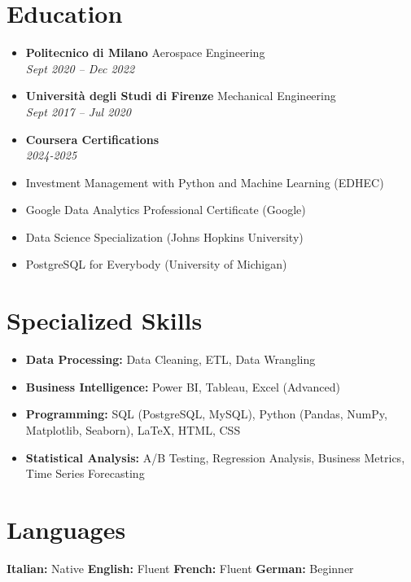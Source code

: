 \documentclass[letterpaper,10.5pt]{article}
\newcommand{\resumeEntry}[4]{
  \item\textbf{#1} \hfill #2\\
  \textit{#3} \hfill \textit{#4}
}
\begin{document}
\section*{Education}
\begin{itemize}[leftmargin=0.2in]
    \resumeEntry{Politecnico di Milano}{Aerospace Engineering}{Sept 2020 -- Dec 2022}{}
    \resumeEntry{Università degli Studi di Firenze}{Mechanical Engineering}{Sept 2017 -- Jul 2020}{}
    \resumeEntry{Coursera Certifications}{}{2024-2025}{}
\end{itemize}
\begin{multicols}{2}
    \small
    \begin{itemize}[leftmargin=0.4 in, label={-}]
        \item Investment Management with Python and Machine Learning (EDHEC)
        \item Google Data Analytics Professional Certificate (Google)
    \end{itemize}
    \begin{itemize}[leftmargin=0.3 in, label={-}]
        \item Data Science Specialization (Johns Hopkins University)
        \item PostgreSQL for Everybody (University of Michigan)
    \end{itemize}
\end{multicols}

\section*{Specialized Skills}\vspace{-10pt}
\begin{multicols}{2}
\begin{itemize}[leftmargin=0.2in]
    \item \textbf{Data Processing:} Data Cleaning, ETL, Data Wrangling
    \item \textbf{Business Intelligence:} Power BI, Tableau, Excel (Advanced)
    \item \textbf{Programming:} SQL (PostgreSQL, MySQL), Python (Pandas, NumPy, Matplotlib, Seaborn), LaTeX, HTML, CSS
    \item \textbf{Statistical Analysis:} A/B Testing, Regression Analysis, Business Metrics, Time Series Forecasting
\end{itemize}
\end{multicols}

\section*{Languages}
\textbf{Italian:} Native \hspace{20pt} \textbf{English:} Fluent \hspace{20pt} \textbf{French:} Fluent \hspace{20pt} \textbf{German:} Beginner
\end{document}
